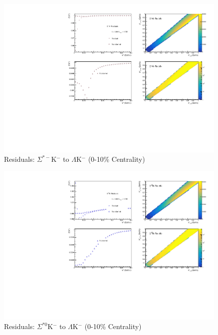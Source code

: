\documentclass[../AnalysisNoteJBuxton.tex]{subfiles}
\begin{document}
\begin{figure}[h]
  \centering
  \includegraphics[width=\textwidth]{9_AdditionalFigures/Figures/Residuals/LamKchM/Residuals_LamKchM_0010_SigStMKchM_MomResCrctn_NonFlatBgdCrctn_10Res_PrimMaxDecay4fm_UsingXiDataAndCoulombOnly.pdf}
  \caption[Residuals: $\Sigma^{*-}$K$^{-}$ to $\Lambda$K$^{-}$ (0-10\% Centrality)]{Residuals: $\Sigma^{*-}$K$^{-}$ to $\Lambda$K$^{-}$ (0-10\% Centrality)}
  \label{fig:Res_LamKchM_0010_SigStMKchM}
\end{figure}

\begin{figure}[h]
  \centering
  \includegraphics[width=\textwidth]{9_AdditionalFigures/Figures/Residuals/LamKchM/Residuals_LamKchM_0010_SigSt0KchM_MomResCrctn_NonFlatBgdCrctn_10Res_PrimMaxDecay4fm_UsingXiDataAndCoulombOnly.pdf}
  \caption[Residuals: $\Sigma^{*0}$K$^{-}$ to $\Lambda$K$^{-}$ (0-10\% Centrality)]{Residuals: $\Sigma^{*0}$K$^{-}$ to $\Lambda$K$^{-}$ (0-10\% Centrality)}
  \label{fig:Res_LamKchM_0010_SigSt0KchM}
\end{figure}
\end{document}
